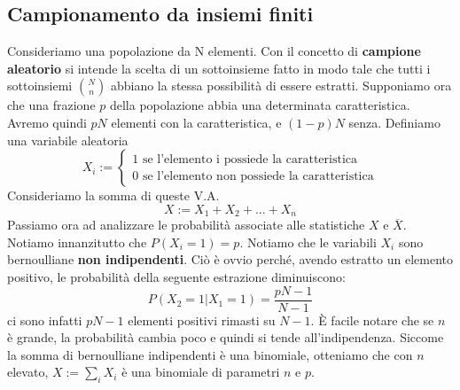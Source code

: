 \documentclass[11pt]{article}
\begin{document}
\subsection{Campionamento da insiemi finiti}
Consideriamo una popolazione da N elementi. Con il concetto di \textbf{campione aleatorio} si intende la scelta di un sottoinsieme fatto in modo tale che tutti i sottoinsiemi ${N \choose n}$ abbiano la stessa possibilità di essere estratti. Supponiamo ora che una frazione $p$ della popolazione abbia una determinata caratteristica. Avremo quindi $pN$ elementi con la caratteristica, e $(1-p)N$ senza. Definiamo una variabile aleatoria
\begin{displaymath}
    X_i:=\begin{cases}
        1 \mbox{ se l'elemento i possiede la caratteristica}\\ 
        0 \mbox{ se l'elemento non possiede la caratteristica}
    \end{cases}
\end{displaymath}
Consideriamo la somma di queste V.A.
\begin{displaymath}
    X:=X_1+X_2+...+X_n
\end{displaymath}
Passiamo ora ad analizzare le probabilità associate alle statistiche $X$ e $\overline{X}$. Notiamo innanzitutto che $P(X_i = 1) = p$. Notiamo che le variabili $X_i$ sono bernoulliane \textbf{non indipendenti}. Ciò è ovvio perché, avendo estratto un elemento positivo, le probabilità della seguente estrazione diminuiscono:
\begin{displaymath}
    P(X_2 = 1 | X_1=1) = \frac{pN-1}{N-1}
\end{displaymath}
ci sono infatti $pN-1$ elementi positivi rimasti su $N-1$. È facile notare che se $n$ è grande, la probabilità cambia poco e quindi si tende all'indipendenza. Siccome la somma di bernoulliane indipendenti è una binomiale, otteniamo che con $n$ elevato, $X:=\sum_i X_i$ è una binomiale di parametri $n$ e $p$.
\end{document}
